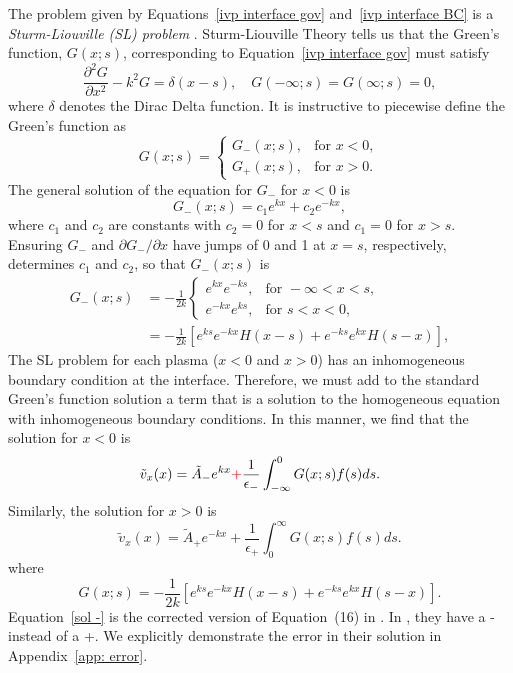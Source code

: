 \documentclass[12pt, draft]{../style-files/ociamthesis}
\begin{document}
The problem given by Equations~\eqref{ivp interface gov} and~\eqref{ivp interface BC} is a \textit{Sturm-Liouville (SL) problem} \citep{boy_etal12}. Sturm-Liouville Theory tells us that the Green's function, $G(x; s)$, corresponding to Equation~\eqref{ivp interface gov} must satisfy 
\begin{equation}
\frac{\partial^2G}{\partial x^2} - k^2 G = \delta(x-s), \quad G(-\infty; s) = G(\infty; s) = 0,
\end{equation}
where $\delta$ denotes the Dirac Delta function. It is instructive to piecewise define the Green's function as
\begin{equation}
G(x; s) = 
\begin{cases}
G_-(x; s), & \text{for } x < 0, \\
G_+(x; s), & \text{for } x > 0.
\end{cases}
\end{equation}
The general solution of the equation for $G_-$ for $x < 0$ is
\begin{equation}
G_-(x; s) = c_1e^{kx} + c_2e^{-kx},
\end{equation}
where $c_1$ and $c_2$ are constants with $c_2 = 0$ for $x < s$ and $c_1 = 0$ for $x > s$. Ensuring $G_-$ and $\partial G_- / \partial x$ have jumps of 0 and 1 at $x = s$, respectively, determines $c_1$ and $c_2$, so that $G_-(x;s)$ is
\begin{equation}
\begin{aligned}
G_-(x; s) & = -\frac{1}{2k} 
\begin{cases}
e^{kx}e^{-ks}, & \text{for } -\infty < x < s, \\
e^{-kx}e^{ks}, & \text{for } s< x < 0,
\end{cases} \\
& = - \frac{1}{2k}\left[e^{ks}e^{-kx}H(x-s) + e^{-ks}e^{kx}H(s-x)\right],
\end{aligned}
\end{equation}
The SL problem for each plasma ($x < 0$ and $x > 0$) has an inhomogeneous boundary condition at the interface. Therefore, we must add to the standard Green's function solution a term that is a solution to the homogeneous equation with inhomogeneous boundary conditions. In this manner, we find that the solution for $x < 0$ is
\begin{equation}
\tilde{v}_x(x) = \tilde{A}_-e^{kx} \textcolor{red}{+} \frac{1}{\epsilon_-}\int_{-\infty}^{0} G(x; s) f(s) ds. \label{sol -}
\end{equation}
Similarly, the solution for $x > 0$ is
\begin{equation}
\tilde{v}_x(x) = \tilde{A}_+e^{-kx} + \frac{1}{\epsilon_+}\int_{0}^{\infty} G(x; s) f(s) ds. \label{sol +}
\end{equation}
where
\begin{equation}
G(x; s) = - \frac{1}{2k}\left[e^{ks}e^{-kx}H(x-s) + e^{-ks}e^{kx}H(s-x)\right].
\end{equation}
Equation~\eqref{sol -} is the corrected version of Equation~(16) in \cite{rae_etal81}. In \cite{rae_etal81}, they have a - instead of a +. We explicitly demonstrate the error in their solution in Appendix~\ref{app: error}.
\end{document}
